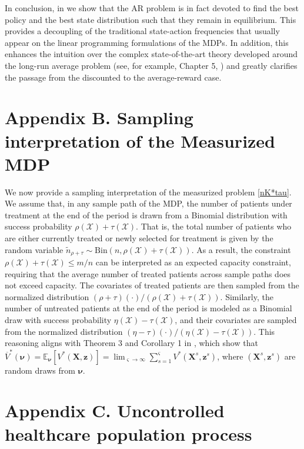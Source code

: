 \documentclass[12pt,a4paper]{article}
\newcommand{\bnu}{\pmb{\nu}}
\newcommand{\bz}{\mathbf{z}}
\newcommand{\bX}{\mathbf{X}}
\newcommand{\oV}{\overline{V}}
\begin{document}
		In conclusion, in \cite{measurized} we show that the AR problem is in fact devoted to find the best policy and the best state distribution such that they remain in equilibrium. This provides a decoupling of the traditional state-action frequencies that usually appear on the linear programming formulations of the MDPs. In addition, this enhances the intuition over the complex state-of-the-art theory developed around the long-run average problem (see, for example, Chapter 5, \cite{lerma}) and greatly clarifies the passage from the discounted to the average-reward case.

        \section*{Appendix B. Sampling interpretation of the Measurized MDP}

        We now provide a sampling interpretation of the measurized problem \eqref{nK*tau}. We assume that, in any sample path of the MDP, the number of patients under treatment at the end of the period is drawn from a Binomial distribution with success probability $\rho(\mathcal{X}) + \tau(\mathcal{X})$. That is, the total number of patients who are either currently treated or newly selected for treatment is given by the random variable $\tilde{n}_{\rho+\tau} \sim \text{Bin}(n, \rho(\mathcal{X}) + \tau(\mathcal{X}))$. As a result, the constraint $\rho(\mathcal{X}) + \tau(\mathcal{X}) \leq m/n$ can be interpreted as an expected capacity constraint, requiring that the average number of treated patients across sample paths does not exceed capacity. The covariates of treated patients are then sampled from the normalized distribution $(\rho + \tau)(\cdot)/(\rho(\mathcal{X}) + \tau(\mathcal{X}))$. Similarly, the number of untreated patients at the end of the period is modeled as a Binomial draw with success probability $\eta(\mathcal{X}) - \tau(\mathcal{X})$, and their covariates are sampled from the normalized distribution $(\eta - \tau)(\cdot)/(\eta(\mathcal{X}) - \tau(\mathcal{X}))$. This reasoning aligns with Theorem 3 and Corollary 1 in \cite{measurized}, which show that $\oV^*(\bnu)=\mathbb{E}_{\bnu} [V^*(\bX,\bz)]=\lim_{\varsigma \to\infty} \sum_{s=1}^{\varsigma} V^*(\bX^s,\bz^s)$, where $(\bX^s,\bz^s)$ are random draws from $\bnu$.
		
		\section*{Appendix C. Uncontrolled healthcare population process \label{appendix:uncontrolled}}
\end{document}
